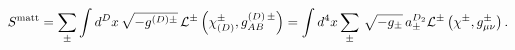 \begin{equation}
    \label{matteraction}
    S^{\rm{matt}}=\sum_{\pm}\int d^{D}x\,
    \sqrt{-g^{(D)\pm}}\,
    {\cal L}^{\pm}\left(\chi^\pm_{(D)},
    g^{(D)\,\pm}_{AB}\right)
    =\int  d^{4}x
    \sum_{\pm} \, \sqrt{-g_{\pm}} \,
    a_\pm^{D_2} {\cal L}^{\pm}\left(\chi^\pm,
g^{\pm}_{\mu\nu}\right).
\end{equation}

